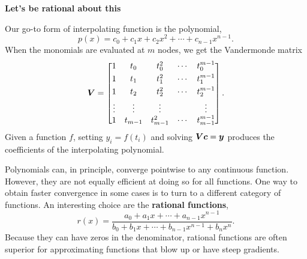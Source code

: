 \documentclass[11pt,twoside]{article}
\begin{document}
   
\begin{center}
    \bf Let's be rational about this
\end{center}

Our go-to form of interpolating function is the polynomial,
\begin{equation}
 p(x) = c_0 + c_1 x + c_2 x^2 + \cdots + c_{n-1} x^{n-1}.
\end{equation}
When the monomials are evaluated at $m$ nodes, we get the Vandermonde matrix
\begin{equation}
\bm{V} = 
 \begin{bmatrix}
      1 & t_0 & t_0^{2} & \cdots & t_0^{m-1} \\[1mm]
      1 & t_1 & t_1^{2} & \cdots & t_1^{m-1}   \\[1mm]
      1 & t_2 & t_2^{2} & \cdots & t_2^{m-1} \\[1mm]
      \vdots & \vdots & \vdots  &  & \vdots \\
      1 & t_{m-1} & t_{m-1}^{2} & \cdots & t_{m-1}^{m-1} 
 \end{bmatrix} .         
\end{equation}
Given a function $f$, setting $y_i=f(t_i)$ and solving $\bm{V} \bm{c} = \bm{y}$ produces the coefficients of the interpolating polynomial.

Polynomials can, in principle, converge pointwise to any continuous function. However, they are not equally efficient at doing so for all functions. One way to obtain faster convergence in some cases is to turn to a different category of functions. An interesting choice are the \textbf{rational functions},
\begin{equation}
\label{ratdef}
 r(x) = \frac{a_0 + a_1 x + \cdots + a_{n-1} x^{n-1}}{b_0 + b_1 x + \cdots + b_{n-1} x^{n-1}+ b_nx^n}.
\end{equation}
Because they can have zeros in the denominator, rational functions are often superior for approximating functions that blow up or have steep gradients. 
\end{document}

